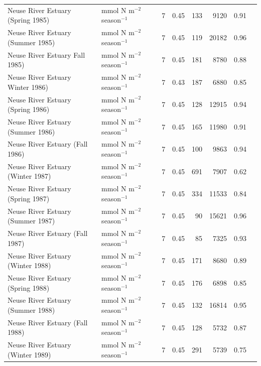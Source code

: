 \documentclass[article]{jss}
\begin{document}
\begin{table}[ht]
\begin{center}
\begin{tiny}
\begin{tabular}{llrrrrrr}
      Neuse River Estuary (Spring 1985) & mmol N m$^{-2}$ season$^{-1}$ &   7 & 0.45 & 133 & 9120 & 0.91 & \citet{christian03} \\
      Neuse River Estuary (Summer 1985) & mmol N m$^{-2}$ season$^{-1}$ &   7 & 0.45 & 119 & 20182 & 0.96 & \citet{christian03} \\
      Neuse River Estuary Fall 1985) & mmol N m$^{-2}$ season$^{-1}$ &   7 & 0.45 & 181 & 8780 & 0.88 & \citet{christian03} \\
      Neuse River Estuary Winter 1986) & mmol N m$^{-2}$ season$^{-1}$ &   7 & 0.43 & 187 & 6880 & 0.85 & \citet{christian03} \\
      Neuse River Estuary (Spring 1986) & mmol N m$^{-2}$ season$^{-1}$ &   7 & 0.45 & 128 & 12915 & 0.94 & \citet{christian03} \\
      Neuse River Estuary (Summer 1986) & mmol N m$^{-2}$ season$^{-1}$ &   7 & 0.45 & 165 & 11980 & 0.91 & \citet{christian03} \\
      Neuse River Estuary (Fall 1986) & mmol N m$^{-2}$ season$^{-1}$ &   7 & 0.45 & 100 & 9863 & 0.94 & \citet{christian03} \\
      Neuse River Estuary (Winter 1987) & mmol N m$^{-2}$ season$^{-1}$ &   7 & 0.45 & 691 & 7907 & 0.62 & \citet{christian03} \\
      Neuse River Estuary (Spring 1987) & mmol N m$^{-2}$ season$^{-1}$ &   7 & 0.45 & 334 & 11533 & 0.84 & \citet{christian03} \\
      Neuse River Estuary (Summer 1987) & mmol N m$^{-2}$ season$^{-1}$ &   7 & 0.45 &  90 & 15621 & 0.96 & \citet{christian03} \\
      Neuse River Estuary (Fall 1987) & mmol N m$^{-2}$ season$^{-1}$ &   7 & 0.45 &  85 & 7325 & 0.93 & \citet{christian03} \\
      Neuse River Estuary (Winter 1988) & mmol N m$^{-2}$ season$^{-1}$ &   7 & 0.45 & 171 & 8680 & 0.89 & \citet{christian03} \\
      Neuse River Estuary (Spring 1988) & mmol N m$^{-2}$ season$^{-1}$ &   7 & 0.45 & 176 & 6898 & 0.85 & \citet{christian03} \\
      Neuse River Estuary (Summer 1988) & mmol N m$^{-2}$ season$^{-1}$ &   7 & 0.45 & 132 & 16814 & 0.95 & \citet{christian03} \\
      Neuse River Estuary (Fall 1988) & mmol N m$^{-2}$ season$^{-1}$ &   7 & 0.45 & 128 & 5732 & 0.87 & \citet{christian03} \\
      Neuse River Estuary (Winter 1989) & mmol N m$^{-2}$ season$^{-1}$ &   7 & 0.45 & 291 & 5739 & 0.75 & \citet{christian03} \\

\end{tabular}
\end{tiny}
\end{center}
\end{table}
\end{document}
